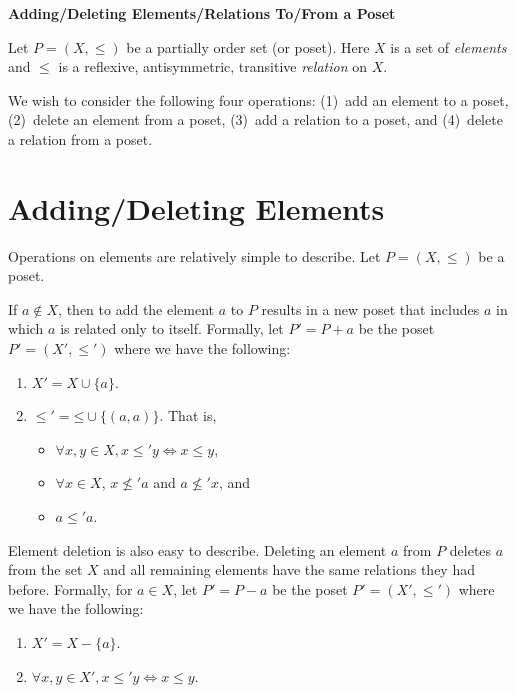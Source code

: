 \documentclass[12pt]{amsart}
\begin{document}
\begin{center}
  \textbf{Adding/Deleting Elements/Relations To/From a Poset}
\end{center}

Let $P=(X,\le)$ be a partially order set (or poset). Here $X$ is a set
of \emph{elements} and $\le$ is a reflexive, antisymmetric, transitive
\emph{relation} on $X$.

We wish to consider the following four operations: (1)~add an element
to a poset, (2)~delete an element from a poset, (3)~add a relation
to a poset, and (4)~delete a relation from a poset. 

\section*{Adding/Deleting Elements}

Operations on elements are relatively simple to describe. Let
$P=(X,\le)$ be a poset. 

If $a\notin X$, then to add the element $a$ to $P$ results in a new
poset that includes $a$ in which $a$ is related only to
itself. Formally, let $P'= P+a$ be the poset $P'=(X',\le')$ where we
have the following:
\begin{enumerate}
\item $X' = X \cup \{a\}$.
\item $\mathord{\le'} = \mathord{\le} \cup \{(a,a)\}$. That is, 
  \begin{itemize}
  \item $\forall x,y \in X, x\le'y\iff x\le y$,
  \item $\forall x \in X$, $x\not\le'a$ and $a \not\le' x$, and
  \item $a\le' a$.
  \end{itemize}
\end{enumerate}

Element deletion is also easy to describe. Deleting an element $a$
from $P$ deletes $a$ from the set $X$ and all remaining elements have
the same relations they had before. Formally, for $a \in X$, let
$P'=P-a$ be the poset $P'=(X',\le')$ where we have the following:
\begin{enumerate}
\item $X' = X - \{a\}$.
\item $\forall x,y \in X', x \le' y \iff x\le y$.
\end{enumerate}
\end{document}
